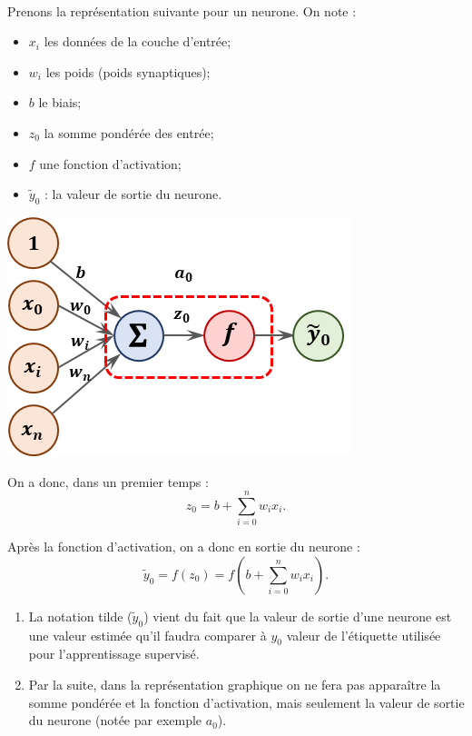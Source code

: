 \begin{defi} ~\\


\begin{minipage}[c]{.55\linewidth}
Prenons la représentation suivante pour un neurone. On note :
\begin{itemize}
\item $x_i$ les données de la couche d'entrée;
\item $w_i$ les poids (poids synaptiques);
\item $b$ le biais;
\item $z_0$ la somme pondérée des entrée;
\item $f$ une fonction d'activation; 
\item $\tilde{y}_0$ : la valeur de sortie du neurone.
\end{itemize}
\end{minipage}
\hfill
\begin{minipage}[c]{.4\linewidth}
\begin{center}
\includegraphics[width=.9\linewidth]{images/fig_01}
\end{center}
\end{minipage}

On a donc, dans un premier temps  :
$$z_0 = b+ \sum\limits_{i=0}^{n} w_i x_i. $$

Après la fonction d'activation, on a donc en sortie du neurone :
$$\tilde{y}_0 = f(z_0)=f \left( b+ \sum\limits_{i=0}^{n} w_i x_i\right).$$

\begin{rem}
\begin{enumerate}
\item La notation tilde ($\tilde{y}_0$) vient du fait que la valeur de sortie d'une neurone est une valeur estimée qu'il faudra comparer à ${y}_0$ valeur de l'étiquette utilisée pour l'apprentissage supervisé.
\item Par la suite, dans la représentation graphique on ne fera pas apparaître la somme pondérée et la fonction d'activation, mais seulement la valeur de sortie du neurone (notée par exemple $a_0$).
\end{enumerate}
\end{rem}

\end{defi}




